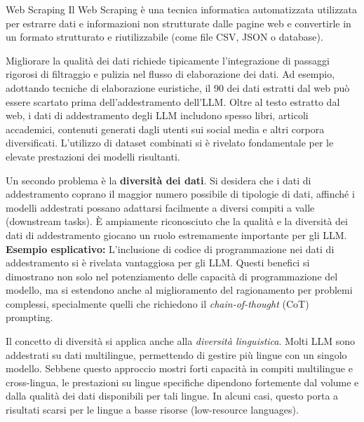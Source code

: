 \begin{observation}{Web Scraping}
    Il Web Scraping è una tecnica informatica automatizzata utilizzata per estrarre dati e informazioni non strutturate dalle pagine web e convertirle in un formato strutturato e riutilizzabile (come file CSV, JSON o database).
\end{observation}

Migliorare la qualità dei dati richiede tipicamente l'integrazione di passaggi rigorosi di filtraggio e pulizia nel flusso di elaborazione dei dati. Ad esempio, adottando tecniche di elaborazione euristiche, il 90 dei dati estratti dal web può essere scartato prima dell'addestramento dell'LLM. Oltre al testo estratto dal web, i dati di addestramento degli LLM includono spesso libri, articoli accademici, contenuti generati dagli utenti sui social media e altri corpora diversificati. L'utilizzo di dataset combinati si è rivelato fondamentale per le elevate prestazioni dei modelli risultanti.

Un secondo problema è la \textbf{diversità dei dati}. Si desidera che i dati di addestramento coprano il maggior numero possibile di tipologie di dati, affinché i modelli addestrati possano adattarsi facilmente a diversi compiti a valle (downstream tasks). È ampiamente riconosciuto che la qualità e la diversità dei dati di addestramento giocano un ruolo estremamente importante per gli LLM.
\textbf{Esempio esplicativo:} L'inclusione di codice di programmazione nei dati di addestramento si è rivelata vantaggiosa per gli LLM. Questi benefici si dimostrano non solo nel potenziamento delle capacità di programmazione del modello, ma si estendono anche al miglioramento del ragionamento per problemi complessi, specialmente quelli che richiedono il \textit{chain-of-thought} (CoT) prompting.

Il concetto di diversità si applica anche alla \textit{diversità linguistica}. Molti LLM sono addestrati su dati multilingue, permettendo di gestire più lingue con un singolo modello. Sebbene questo approccio mostri forti capacità in compiti multilingue e cross-lingua, le prestazioni su lingue specifiche dipendono fortemente dal volume e dalla qualità dei dati disponibili per tali lingue. In alcuni casi, questo porta a risultati scarsi per le lingue a basse risorse (low-resource languages).

